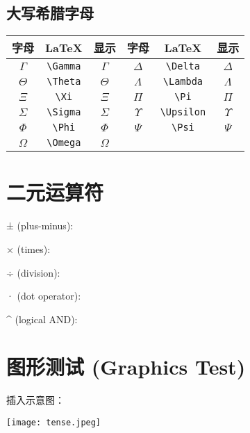 \documentclass[a4paper,12pt]{article}
\begin{document}
    \subsection*{大写希腊字母}
    \begin{tabular}{c c c c c c}
        \hline
        字母       & LaTeX         & 显示       & 字母         & LaTeX           & 显示         \\
        \hline
        $\Gamma$ & \verb|\Gamma| & $\Gamma$ & $\Delta$   & \verb|\Delta|   & $\Delta$   \\
        $\Theta$ & \verb|\Theta| & $\Theta$ & $\Lambda$  & \verb|\Lambda|  & $\Lambda$  \\
        $\Xi$    & \verb|\Xi|    & $\Xi$    & $\Pi$      & \verb|\Pi|      & $\Pi$      \\
        $\Sigma$ & \verb|\Sigma| & $\Sigma$ & $\Upsilon$ & \verb|\Upsilon| & $\Upsilon$ \\
        $\Phi$   & \verb|\Phi|   & $\Phi$   & $\Psi$     & \verb|\Psi|     & $\Psi$     \\
        $\Omega$ & \verb|\Omega| & $\Omega$ &            &                 &            \\
        \hline
    \end{tabular}


    \section*{二元运算符}
    ± (plus-minus):\pm

    × (times):\times

    ÷ (division):\div

    · (dot operator):\dot

    ^ (logical AND):\wedge


    \section*{图形测试 (Graphics Test)}
    插入示意图：

    \texttt{[image: tense.jpeg]}
\end{document}
